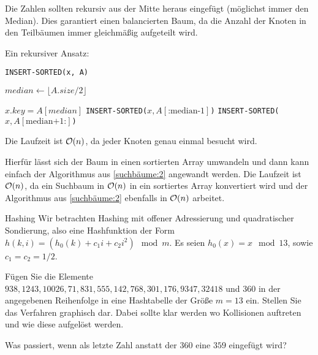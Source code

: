 \documentclass{exercisesheet}
\begin{document}
\begin{solutions}
  \item Die Zahlen sollten rekursiv aus der Mitte heraus eingefügt (möglichst immer den Median). Dies garantiert einen balancierten Baum, da die Anzahl der Knoten in den Teilbäumen immer gleichmäßig aufgeteilt wird.
  \item Ein rekursiver Ansatz:
  \begin{algorithm}[ht]
    \caption{\texttt{INSERT-SORTED(x, A)}}
    \BlankLine

    $median \gets \lfloor A.size/2 \rfloor$\;


    $x.key = A[median]$\;
    \texttt{INSERT-SORTED($x, A[\text{:median-1}]$)}\;
    \texttt{INSERT-SORTED($x, A[\text{median+1:}]$)}
  \end{algorithm}
  Die Laufzeit ist $\mathcal{O}(n)$, da jeder Knoten genau einmal besucht wird.
  \item Hierfür lässt sich der Baum in einen sortierten Array umwandeln und dann kann einfach der Algorithmus aus \ref{suchbäume:2} angewandt werden. Die Laufzeit ist $\mathcal{O}(n)$, da ein Suchbaum in $\mathcal{O}(n)$ in ein sortiertes Array konvertiert wird und der Algorithmus aus \ref{suchbäume:2} ebenfalls in $\mathcal{O}(n)$ arbeitet.
\end{solutions}

\begin{eexercises}{Hashing}{
    Wir betrachten Hashing mit offener Adressierung und quadratischer Sondierung, also eine Hashfunktion der Form $h(k, i) = (h_0(k) + c_1i + c_2i^2) \mod m$. Es seien $h_0(x) = x \mod 13$, sowie $c_1 = c_2 = 1/2$.
  }
  \item Fügen Sie die Elemente $938, 1243, 10026, 71, 831, 555, 142, 768, 301, 176, 9347, 32418$ und $360$ in der angegebenen Reihenfolge in eine Hashtabelle der Größe $m = 13$ ein. Stellen Sie das Verfahren graphisch dar. Dabei sollte klar werden wo Kollisionen auftreten und wie diese aufgelöst werden.
  \item Was passiert, wenn als letzte Zahl anstatt der $360$ eine $359$ eingefügt wird?
\end{eexercises}
\end{document}
